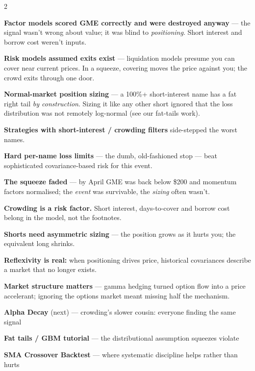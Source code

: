 \documentclass{pyportfolios-note}
\begin{document}
\begin{multicols}{2}
\begin{notebullets}
\item \textbf{Factor models scored GME correctly and were destroyed anyway} —
      the signal wasn't wrong about value; it was blind to \textit{positioning}.
      Short interest and borrow cost weren't inputs.
\item \textbf{Risk models assumed exits exist} — liquidation models presume you
      can cover near current prices. In a squeeze, covering moves the price
      against you; the crowd exits through one door.
\item \textbf{Normal-market position sizing} — a 100\%+ short-interest name has
      a fat right tail \textit{by construction}. Sizing it like any other short
      ignored that the loss distribution was not remotely log-normal (see our
      fat-tails work).
\end{notebullets}

\begin{notebullets}
\item \textbf{Strategies with short-interest / crowding filters} side-stepped
      the worst names.
\item \textbf{Hard per-name loss limits} — the dumb, old-fashioned stop — beat
      sophisticated covariance-based risk for this event.
\item \textbf{The squeeze faded} — by April GME was back below \$200 and
      momentum factors normalised; the \textit{event} was survivable, the
      \textit{sizing} often wasn't.
\end{notebullets}

\begin{notebulletsnum}
\item \textbf{Crowding is a risk factor.} Short interest, days-to-cover and
      borrow cost belong in the model, not the footnotes.
\item \textbf{Shorts need asymmetric sizing} — the position grows as it hurts
      you; the equivalent long shrinks.
\item \textbf{Reflexivity is real:} when positioning drives price, historical
      covariances describe a market that no longer exists.
\item \textbf{Market structure matters} — gamma hedging turned option flow into
      a price accelerant; ignoring the options market meant missing half the
      mechanism.
\end{notebulletsnum}

\begin{notebullets}
\item \textbf{Alpha Decay} (next) — crowding's slower cousin: everyone finding
      the same signal
\item \textbf{Fat tails / GBM tutorial} — the distributional assumption squeezes
      violate
\item \textbf{SMA Crossover Backtest} — where systematic discipline helps rather
      than hurts
\end{notebullets}
\end{multicols}
\end{document}
